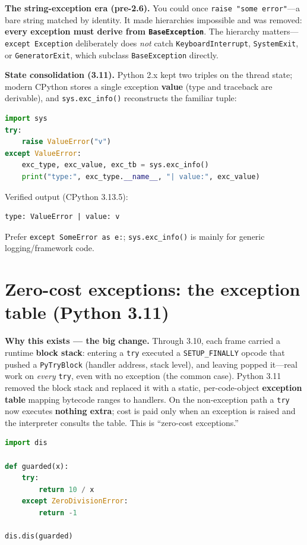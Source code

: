 \textbf{The string-exception era (pre-2.6).} You could once \texttt{raise "some error"}---a bare
string matched by identity. It made hierarchies impossible and was removed: \textbf{every
exception must derive from \texttt{BaseException}}. The hierarchy matters---\texttt{except
Exception} deliberately does \emph{not} catch \texttt{KeyboardInterrupt}, \texttt{SystemExit}, or
\texttt{GeneratorExit}, which subclass \texttt{BaseException} directly.

\textbf{State consolidation (3.11).} Python 2.x kept two triples on the thread state; modern
CPython stores a single exception \textbf{value} (type and traceback are derivable), and
\texttt{sys.exc\_info()} reconstructs the familiar tuple:

\begin{lstlisting}[language=Python, caption={sys.exc\_info() inside an except block.}]
import sys
try:
    raise ValueError("v")
except ValueError:
    exc_type, exc_value, exc_tb = sys.exc_info()
    print("type:", exc_type.__name__, "| value:", exc_value)
\end{lstlisting}

Verified output (CPython 3.13.5):

\begin{lstlisting}[caption={Output}]
type: ValueError | value: v
\end{lstlisting}

Prefer \texttt{except SomeError as e:}; \texttt{sys.exc\_info()} is mainly for generic
logging/framework code.

\section{Zero-cost exceptions: the exception table (Python 3.11)}

\textbf{Why this exists --- the big change.} Through 3.10, each frame carried a runtime
\textbf{block stack}: entering a \texttt{try} executed a \texttt{SETUP\_FINALLY} opcode that
pushed a \texttt{PyTryBlock} (handler address, stack level), and leaving popped it---real work on
\emph{every} \texttt{try}, even with no exception (the common case). Python 3.11 removed the block
stack and replaced it with a static, per-code-object \textbf{exception table} mapping bytecode
ranges to handlers. On the non-exception path a \texttt{try} now executes \textbf{nothing extra};
cost is paid only when an exception is raised and the interpreter consults the table. This is
``zero-cost exceptions.''

\begin{lstlisting}[language=Python, caption={A try/except compiles to an exception table, not block-stack setup.}]
import dis

def guarded(x):
    try:
        return 10 / x
    except ZeroDivisionError:
        return -1

dis.dis(guarded)
\end{lstlisting}

